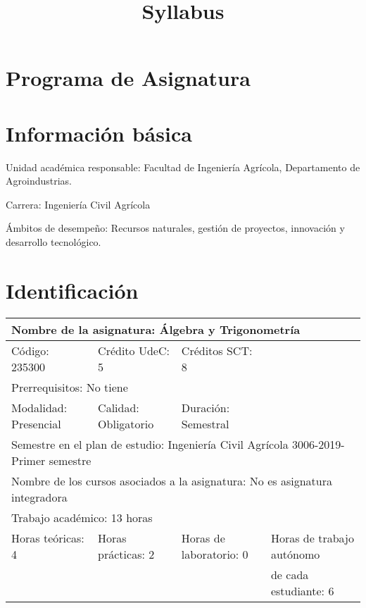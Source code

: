 \documentclass[11pt]{article}
\date{}
\title{Syllabus}
\begin{document}
\maketitle

\vspace{-60px}

\section*{Programa de Asignatura}
\label{sec:org750cca4}

\section{Información básica}
\label{sec:orgfa3fb76}
Unidad académica responsable: Facultad de Ingeniería Agrícola, Departamento de Agroindustrias.

Carrera: Ingeniería Civil Agrícola

Ámbitos de desempeño: Recursos naturales, gestión de proyectos, innovación y desarrollo tecnológico.

\section{Identificación}
\label{sec:org5f1375a}

\begin{center}
\begin{tabular}{|l|l|l|l|}
\hline
\multicolumn{4}{|l|}{Nombre de la asignatura: Álgebra y Trigonometría} \\
\hline
Código: 235300 & Crédito UdeC: 5 & Créditos SCT: 8 & \\
\hline
\multicolumn{4}{|l|}{Prerrequisitos: No tiene} \\
\hline
Modalidad: Presencial & Calidad: Obligatorio & Duración: Semestral & \\
\hline
\multicolumn{4}{|l|}{Semestre en el plan de estudio: Ingeniería Civil Agrícola 3006-2019-Primer semestre} \\
\hline
\multicolumn{4}{|l|}{Nombre de los cursos asociados a la asignatura: No es asignatura integradora} \\
\hline
\multicolumn{4}{|l|}{Trabajo académico: 13 horas} \\
\hline
Horas teóricas: 4 & Horas prácticas: 2 & Horas de laboratorio: 0 & Horas de trabajo autónomo \\
 & & & de cada estudiante: 6 \\
\hline
\end{tabular}
\end{center}
\end{document}
